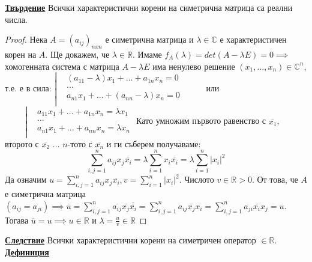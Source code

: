\documentclass{article}
\begin{document}
\textbf{\underline{Твърдение}} \newline
Всички характеристични корени на симетрична матрица са реални числа.
\begin{proof}
Нека $A = (a_{ij})_{nxn}$ е симетрична матрица и $\lambda \in \mathbb{C}$ е характеристичен корен на $A$. Ще докажем, че $\lambda
\in \mathbb{R}$. \newline
Имаме $f_A(\lambda) = det(A - \lambda E) = 0 \implies$ хомогенната система с матрица $A - \lambda E$ има ненулево решение
$(x_1, ..., x_n) \in \mathbb{C}^n$, т.е. е в сила: \newline\newline
$\left| \begin{aligned}
    & (a_{11} - \lambda)x_1 + ... + a_{1n}x_n = 0 \\
    & \hdots  \\
    & a_{n1}x_1 + ... + (a_{nn} - \lambda)x_n = 0 \\
\end{aligned}\right. \hspace{1cm}$
или $\hspace{1cm} \left| \begin{aligned}
    & a_{11}x_1 + ... + a_{1n}x_n = \lambda x_1 \\
    & \hdots  \\
    & a_{n1}x_1 + ... + a_{nn}x_n = \lambda x_n \\
\end{aligned}\right.$ \newline\newline
Като умножим първото равенство с $\overline{x_1}$, второто с $\overline{x_2}$ ... $n$-тото с $\overline{x_n}$ и ги съберем
получаваме: $$\sum_{i, j = 1}^{n}a_{ij}x_j\overline{x_i} = \lambda \sum_{i = 1}^{n}x_i\overline{x_i} = \lambda \sum_{i = 1}^{n}|x_i|^2$$
Да означим $u = \sum_{i, j = 1}^{n}a_{ij}x_j\overline{x_i}, v = \sum_{i = 1}^{n}|x_i|^2$. Числото $v \in \mathbb{R} > 0$.
От това, че $A$ е симетрична матрица $(a_{ij} = a_{ji}) \implies \overline{u} = \sum_{i, j = 1}^{n}\overline{a_{ij}}
\overline{x_j}\overline{\overline{x_i}} = \sum_{i, j = 1}^{n}a_{ij}\overline{x_j}x_i = \sum_{i, j = 1}^{n}a_{ji}\overline{x_i}
x_j = u$. Тогава $\overline{u} = u \implies u \in \mathbb{R}$ и $\lambda = \frac{u}{v} \in \mathbb{R}$
\end{proof}
\textbf{\underline{Следствие}}
Всички характеристични корени на симетричен оператор $\in \mathbb{R}$. \newline\newline
\textbf{\underline{Дефиниция}}
\end{document}
